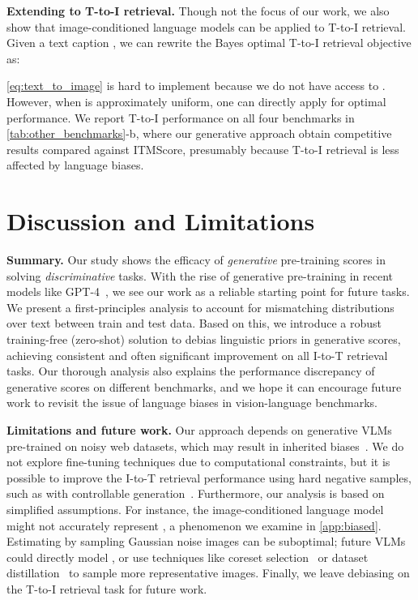 \documentclass{article} \usepackage{iclr2024_conference,times}
\begin{document}
{\bf Extending to T-to-I retrieval.} Though not the focus of our work, we also show that image-conditioned language models can be applied to T-to-I retrieval. Given a text caption , we can rewrite the Bayes optimal T-to-I retrieval objective as:

\autoref{eq:text_to_image} is hard to implement because we do not have access to . However, when  is approximately uniform, one can directly apply  for optimal performance. We report T-to-I performance on all four benchmarks in \autoref{tab:other_benchmarks}-b, where our generative approach obtain competitive results compared against ITMScore, presumably because T-to-I retrieval is less affected by language biases.












\section{Discussion and Limitations}
{\bf Summary.} Our study shows the efficacy of {\em generative} pre-training scores in solving {\em discriminative} tasks. With the rise of generative pre-training in recent models like GPT-4~\citep{gpt4}, we see our work as a reliable starting point for future tasks. We present a first-principles analysis to account for mismatching distributions over text between train and test data. Based on this, we introduce a robust training-free (zero-shot) solution to debias linguistic priors in generative scores, achieving consistent and often significant improvement on all I-to-T retrieval tasks. Our thorough analysis also explains the performance discrepancy of generative scores on different benchmarks, and we hope it can encourage future work to revisit the issue of language biases in vision-language benchmarks.

{\bf Limitations and future work.} Our approach depends on generative VLMs pre-trained on noisy web datasets, which may result in inherited biases~\citep{mehrabi2021survey}. We do not explore fine-tuning techniques due to computational constraints, but it is possible to improve the I-to-T retrieval performance using hard negative samples, such as with controllable generation~\citep{keskar2019ctrl}. Furthermore, our analysis is based on simplified assumptions. For instance, the image-conditioned language model might not accurately represent , a phenomenon we examine in \autoref{app:biased}. Estimating   by sampling Gaussian noise images can be suboptimal; future VLMs could directly model , or use techniques like coreset selection~\citep{guo2022deepcore} or dataset distillation~\citep{wu2023multimodal} to sample more representative images. Finally, we leave debiasing on the T-to-I retrieval task for future work.
\end{document}
